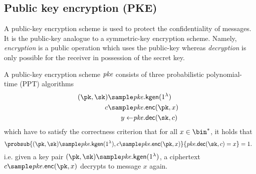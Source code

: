 \newpage
\subsection{Public key encryption (PKE)}
A public-key encryption scheme is used to protect the confidentiality of messages. It is the public-key analogue to a symmetric-key encryption scheme. Namely, \emph{encryption} is a public operation which uses the public-key whereas \emph{decryption} is only possible for the receiver in possession of the secret key.
\begin{syntax}
	A public-key encryption scheme $\mathit{{pke}}$ consists of three probabilistic polynomial-time (PPT) algorithms
	\begin{align*}
		(\pk, \sk) \sample & \pke.\kgen(1^\lambda) \\
		c \sample          & \pke.\enc(\pk,x)      \\
		y \gets            & \pke.\dec(\sk,c)      \\
	\end{align*}
	which have to satisfy the correctness criterion that for all $x\in\bin^*$, it holds that
	\[\probsub{(\pk,\sk)\sample\pke.\kgen(1^\lambda),c\sample\pke.\enc(\pk,x)}{\pke.\dec(\sk,c)=x}=1.\]
	i.e. given a key pair $(\pk,\sk)\sample\pke.\kgen(1^\lambda)$, a ciphertext $c\sample\pke.\enc(\pk,x)$ decrypts to message $x$ again.
\end{syntax}

